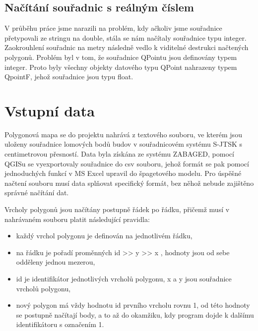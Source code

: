 \documentclass[11pt]{article}
\begin{document}
\subsection{Načítání souřadnic s reálným číslem}
V průběhu práce jsme narazili na problém, kdy ačkoliv jsme souřadnice přetypovali ze stringu na double, stála se nám načítaly souřadnice typu integer. Zaokrouhlení souřadnic na metry následně vedlo k viditelné destrukci načtených polygonů. Problém byl v tom, že souřadnice QPointu jsou definovány typem integer. Proto byly všechny objekty datového typu QPoint nahrazeny typem QpointF, jehož souřadnice jsou typu float.


\clearpage
		
		
		
		\section{Vstupní data}
		Polygonová mapa se do projektu nahrává z textového souboru, ve kterém jsou uloženy souřadnice lomových bodů budov v souřadnicovém systému S-JTSK s centimetrovou přesností. Data byla získána ze systému ZABAGED, pomocí QGISu se vyexportovaly souřadnice do csv souboru, jehož formát se pak pomocí jednoduchých funkcí v MS Excel upravil do špagetového modelu. Pro úspěšné načtení souboru musí data splňovat specifický formát, bez něhož nebude zajištěno správné načítání dat.  
		
		Vrcholy polygonů jsou načítány postupně řádek po řádku, přičemž musí v nahrávaném souboru platit následující pravidla:    
		
		\begin{itemize}
			\item každý vrchol polygonu je definován na jednotlivém řádku,
			\item na řádku je pořadí proměnných id >> y >> x   ,  hodnoty jsou od sebe odděleny  jednou mezerou,
			\item id je identifikátor jednotlivých vrcholů polygonu, x a y jsou souřadnice vrcholů polygonu,    
			\item nový polygon má vždy hodnotu id prvního vrcholu rovnu 1, od této hodnoty  se  postupně načítají body, a  to až do okamžiku,  kdy program dojde  k dalšímu identifikátoru s označením 1.   
		\end{itemize}
		
\end{document}
